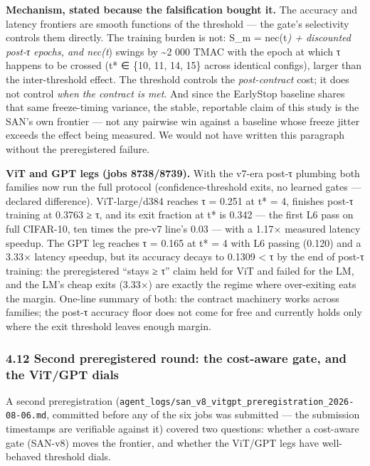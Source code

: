 \documentclass[
]{article}
\begin{document}
\textbf{Mechanism, stated because the falsification bought it.} The
accuracy and latency frontiers are smooth functions of the threshold ---
the gate's selectivity controls them directly. The training burden is
not: S\_m = nec(t\emph{) + discounted post-τ epochs, and nec(t}) swings
by \textasciitilde2 000 TMAC with the epoch at which τ happens to be
crossed (t* ∈ \{10, 11, 14, 15\} across identical configs), larger than
the inter-threshold effect. The threshold controls the
\emph{post-contract} cost; it does not control \emph{when the contract
is met}. And since the EarlyStop baseline shares that same freeze-timing
variance, the stable, reportable claim of this study is the SAN's own
frontier --- not any pairwise win against a baseline whose freeze jitter
exceeds the effect being measured. We would not have written this
paragraph without the preregistered failure.

\textbf{ViT and GPT legs (jobs 8738/8739).} With the v7-era post-τ
plumbing both families now run the full protocol (confidence-threshold
exits, no learned gates --- declared difference). ViT-large/d384 reaches
τ = 0.251 at t* = 4, finishes post-τ training at 0.3763 ≥ τ, and its
exit fraction at t* is 0.342 --- the first L6 pass on full CIFAR-10, ten
times the pre-v7 line's 0.03 --- with a 1.17× measured latency speedup.
The GPT leg reaches τ = 0.165 at t* = 4 with L6 passing (0.120) and a
3.33× latency speedup, but its accuracy decays to 0.1309 \textless{} τ
by the end of post-τ training: the preregistered ``stays ≥ τ'' claim
held for ViT and failed for the LM, and the LM's cheap exits (3.33×) are
exactly the regime where over-exiting eats the margin. One-line summary
of both: the contract machinery works across families; the post-τ
accuracy floor does not come for free and currently holds only where the
exit threshold leaves enough margin.

\hypertarget{second-preregistered-round-the-cost-aware-gate-and-the-vitgpt-dials}{%
\subsubsection{4.12 Second preregistered round: the cost-aware gate, and
the ViT/GPT
dials}\label{second-preregistered-round-the-cost-aware-gate-and-the-vitgpt-dials}}

A second preregistration
(\texttt{agent\_logs/san\_v8\_vitgpt\_preregistration\_2026-08-06.md},
committed before any of the six jobs was submitted --- the submission
timestamps are verifiable against it) covered two questions: whether a
cost-aware gate (SAN-v8) moves the frontier, and whether the ViT/GPT
legs have well-behaved threshold dials.
\end{document}
